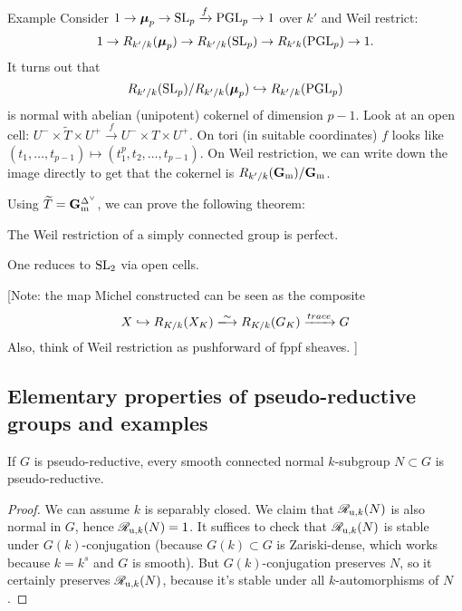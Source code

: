 \begin{enonce}[remark]{Example}
Consider 
$1 \to \boldsymbol\mu_p \to \operatorname{SL}_p \xrightarrow f \operatorname{PGL}_p \to 1$ 
over $k'$ and Weil restrict: 
\[
  1 \to R_{k'/k}(\boldsymbol\mu_p) \to R_{k'/k}(\operatorname{SL}_p) \to R_{k'k}(\operatorname{PGL}_p) \to 1. 
\]
It turns out that 
\[
  R_{k'/k}(\operatorname{SL}_p)/R_{k'/k}(\boldsymbol\mu_p) \hookrightarrow R_{k'/k}(\operatorname{PGL}_p) 
\]
is normal with abelian (unipotent) cokernel of dimension $p-1$. Look at an open 
cell: $U^-\times \widetilde T\times U^+ \xrightarrow f U^- \times T \times U^+$. 
On tori (in suitable coordinates) $f$ looks like $(t_1,\dots,t_{p-1})\mapsto (t_1^p,t_2,\dots,t_{p-1})$. 
On Weil restriction, we can write down the image directly to get that the cokernel 
is $R_{k'/k} (\mathbf{G}_{\mathrm{m}})/\mathbf{G}_{\mathrm{m}}$. 
\end{enonce}

Using $\widetilde T=\mathbf{G}_{\mathrm{m}}^{\Delta^\vee}$, we can prove the following theorem: 

\begin{theo}
The Weil restriction of a simply connected group is perfect. 
\end{theo}

One reduces to $\operatorname{SL}_2$ via open cells. 

[Note: the map Michel constructed can be seen as the composite 
\[
  X \hookrightarrow R_{K/k}(X_K) \isomorphism R_{K/k}(G_K) \xrightarrow{trace} G
\]
Also, think of Weil restriction as pushforward of fppf sheaves. 
]





\subsection{Elementary properties of pseudo-reductive groups and examples}

\begin{lemm}
If $G$ is pseudo-reductive, every smooth connected normal $k$-subgroup 
$N\subset G$ is pseudo-reductive. 
\end{lemm}
\begin{proof}
We can assume $k$ is separably closed. We claim that $\mathscr{R}_{\mathrm{u},k}(N)$ is also normal 
in $G$, hence $\mathscr{R}_{\mathrm{u},k}(N)=1$. It suffices to check that $\mathscr{R}_{\mathrm{u},k}(N)$ is 
stable under $G(k)$-conjugation (because $G(k)\subset G$ is Zariski-dense, which 
works because $k=k^s$ and $G$ is smooth). But $G(k)$-conjugation preserves $N$, 
so it certainly preserves $\mathscr{R}_{\mathrm{u},k}(N)$, because it's stable under all 
$k$-automorphisms of $N$. 
\end{proof}

